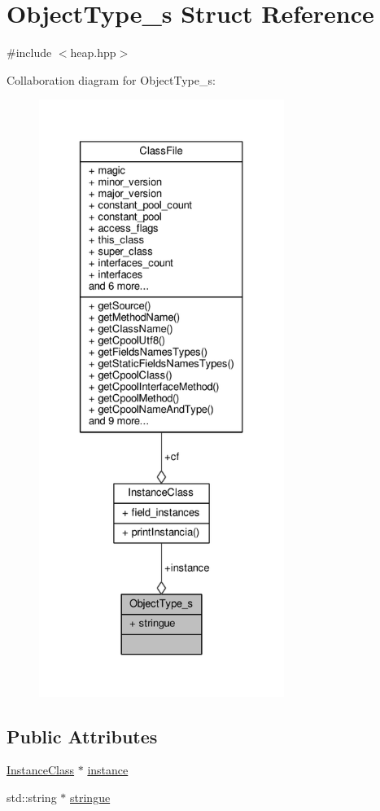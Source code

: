 \hypertarget{structObjectType__s}{\section{Object\+Type\+\_\+s Struct Reference}
\label{structObjectType__s}
}


{\ttfamily \#include $<$heap.\+hpp$>$}



Collaboration diagram for Object\+Type\+\_\+s\+:
\nopagebreak
\begin{figure}[H]
\begin{center}
\leavevmode
\includegraphics[height=550pt]{structObjectType__s__coll__graph}
\end{center}
\end{figure}
\subsection*{Public Attributes}
\begin{DoxyCompactItemize}
\item 
\hyperlink{classInstanceClass}{Instance\+Class} $\ast$ \hyperlink{structObjectType__s_ace1fa4b359f32f92954516a5de896350}{instance}
\item 
std\+::string $\ast$ \hyperlink{structObjectType__s_a3ce93c0128356d1776c374e864ec2a13}{stringue}
\end{DoxyCompactItemize}


